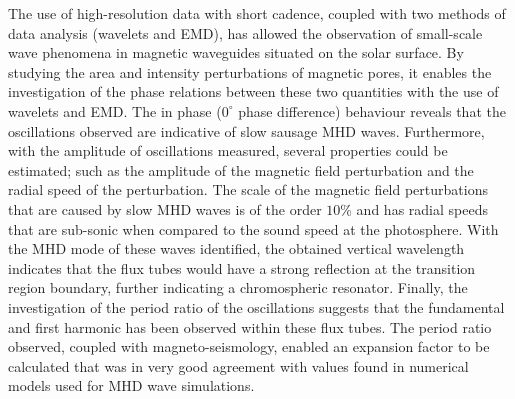     The use of high-resolution data with short cadence, coupled with two methods of data analysis (wavelets and EMD), has allowed the observation of small-scale wave phenomena in magnetic waveguides situated on the solar surface.
    By studying the area and intensity perturbations of magnetic pores, it enables the investigation of the phase relations between these two quantities with the use of wavelets and EMD.
    The in phase ($0^\circ$ phase difference) behaviour reveals that the oscillations observed are indicative of slow sausage MHD waves. 
    Furthermore, with the amplitude of oscillations measured, several properties could be estimated; such as the amplitude of the magnetic field perturbation and the radial speed of the perturbation.
    The scale of the magnetic field perturbations that are caused by slow MHD waves is of the order $10$\% and has radial speeds that are sub-sonic when compared to the sound speed at the photosphere.  
    With the MHD mode of these waves identified, the obtained vertical wavelength indicates that the flux tubes would have a strong reflection at the transition region boundary, further indicating a chromospheric resonator. 
    Finally, the investigation of the period ratio of the oscillations suggests that the fundamental and first harmonic has been observed within these flux tubes.
    The period ratio observed, coupled with magneto-seismology, enabled an expansion factor to be calculated that was in very good agreement with values found in numerical models used for MHD wave simulations.